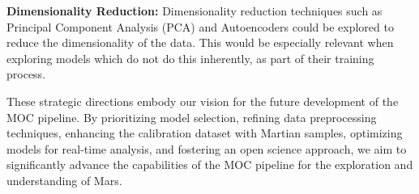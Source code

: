 \textbf{Dimensionality Reduction:} Dimensionality reduction techniques such as Principal Component Analysis (PCA) and Autoencoders could be explored to reduce the dimensionality of the data.
This would be especially relevant when exploring models which do not do this inherently, as part of their training process.



These strategic directions embody our vision for the future development of the MOC pipeline.
By prioritizing model selection, refining data preprocessing techniques, enhancing the calibration dataset with Martian samples, optimizing models for real-time analysis, and fostering an open science approach, we aim to significantly advance the capabilities of the MOC pipeline for the exploration and understanding of Mars.
